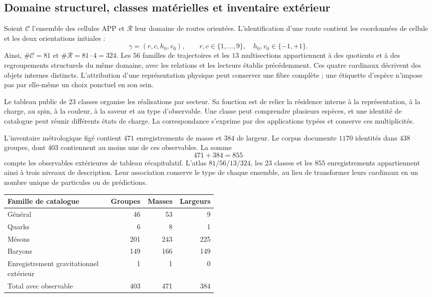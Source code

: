 \subsection{Domaine structurel, classes matérielles et inventaire extérieur}
\label{vi:subsec:vi-dominios-contraste}

Soient \(\mathcal C\) l’ensemble des cellules APP et \(\mathcal R\) leur domaine
de routes orientées. L’identification d’une route contient les coordonnées
de cellule et les deux orientations initiales :
\[
 \gamma=(r,c,h_0,v_0),\qquad
 r,c\in\{1,\ldots,9\},\quad h_0,v_0\in\{-1,+1\}.
\]
Ainsi, \(\#\mathcal C=81\) et \(\#\mathcal R=81\cdot4=324\).
Les \(56\) familles de trajectoires et les \(13\) multisections appartiennent
à des quotients et à des regroupements structurels du même domaine, avec les
relations et les lecteurs établis précédemment. Ces quatre cardinaux
décrivent des objets internes distincts. L'attribution d'une représentation
physique peut conserver une fibre complète ; une étiquette d'espèce n'impose
pas par elle-même un choix ponctuel en son sein.

Le tableau public de \(23\) classes organise les réalisations par secteur.
Sa fonction est de relier la résidence interne à la représentation, à la
charge, au spin, à la couleur, à la saveur et au type d'observable. Une classe peut
comprendre plusieurs espèces, et une identité de catalogue peut réunir
différents états de charge. La correspondance s'exprime par des applications
typées et conserve ces multiplicités.

L’inventaire métrologique figé contient \(471\) enregistrements de masse et
\(384\) de largeur. Le corpus documente \(1170\) identités dans \(438\)
groupes, dont \(403\) contiennent au moins une de ces observables.
La somme
\[
 471+384=855
\]
compte les observables extérieures de tableau récapitulatif. L’atlas \(81/56/13/324\),
les \(23\) classes et les \(855\) enregistrements appartiennent ainsi à trois niveaux
de description. Leur association conserve le type de chaque ensemble, au lieu
de transformer leurs cardinaux en un nombre unique de particules ou de prédictions.

\begin{center}
\begin{tabular}{p{0.49\linewidth}rrr}
\toprule
Famille de catalogue & Groupes & Masses & Largeurs\\
\midrule
Général & 46 & 53 & 9\\
Quarks
 & 6 & 8 & 1\\
Mésons & 201 & 243 & 225\\
Baryons & 149 & 166 & 149\\
Enregistrement gravitationnel extérieur & 1 & 1 & 0\\
\midrule
Total avec observable & 403 & 471 & 384\\
\bottomrule
\end{tabular}
\end{center}

